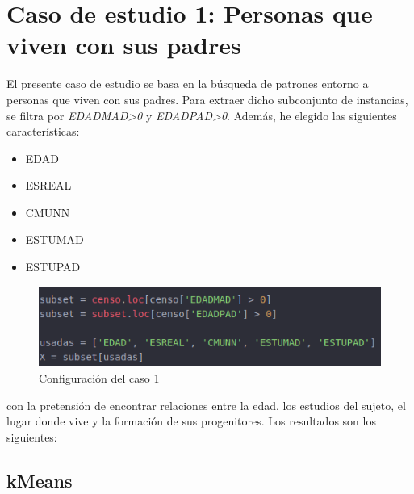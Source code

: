 \newpage


\section{Caso de estudio 1: Personas que viven con sus padres}

El presente caso de estudio se basa en la búsqueda de patrones entorno a personas que viven con sus padres. Para extraer dicho subconjunto de instancias, se filtra por \textit{EDADMAD>0} y \textit{EDADPAD>0}. Además, he elegido las siguientes características:
\begin{itemize}
	\item EDAD
	\item ESREAL
	\item CMUNN
	\item ESTUMAD
	\item ESTUPAD
\end{itemize}

\begin{figure}[H] %
	\centering
	\includegraphics[scale=0.5]{c1-1.png}  %
	\caption{Configuración del caso 1} 
	\label{fig:configuración-caso1}
\end{figure}

con la pretensión de encontrar relaciones entre la edad, los estudios del sujeto, el lugar donde vive y la formación de sus progenitores. Los resultados son los siguientes:

\subsection{kMeans}

